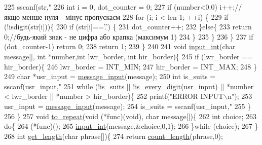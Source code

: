 \begin{DoxyCodeInclude}
{{{{{225     sscanf(str,\textcolor{stringliteral}{"%
226     \textcolor{keywordtype}{int} i = 0, dot\_counter = 0;
227     \textcolor{keywordflow}{if} (number<0.0) i++;\textcolor{comment}{// якщо менше нуля - мінус пропускаєм}
228     \textcolor{keywordflow}{for} (i; i < len-1; ++i) \{
229         \textcolor{keywordflow}{if} (!isdigit(str[i]))\{
230             \textcolor{keywordflow}{if} (str[i]==\textcolor{charliteral}{'.'}) \{
231                 dot\_counter++;
232             \}\textcolor{keywordflow}{else}\{
233                 \textcolor{keywordflow}{return} 0;\textcolor{comment}{//будь-який знак - не цифра або крапка (максимум 1)}
234             \}
235         \}
236     \}
237     \textcolor{keywordflow}{if} (dot\_counter-1) \textcolor{keywordflow}{return} 0;
238     \textcolor{keywordflow}{return} 1;
239 \}
240 
241 \textcolor{keywordtype}{void} \hyperlink{main_8c_a6f453bc035d85e967bd5032eca31a155}{input\_int}(\textcolor{keywordtype}{char} message[], \textcolor{keywordtype}{int} *number,\textcolor{keywordtype}{int} lwr\_border, \textcolor{keywordtype}{int} hir\_border)\{
245     \textcolor{keywordflow}{if} (lwr\_border == hir\_border)\{
246         lwr\_border = INT\_MIN;
247         hir\_border = INT\_MAX;
248     \}
249     \textcolor{keywordtype}{char} *usr\_input = \hyperlink{main_8c_a638293d509eded9d6ef7552ae1b17f2b}{message\_input}(message);
250     \textcolor{keywordtype}{int} is\_suits = sscanf(usr\_input,\textcolor{stringliteral}{"%
251     \textcolor{keywordflow}{while} (!is\_suits || !\hyperlink{main_8c_a9594b83ee908d195f5ff508da5c23c58}{is\_every\_digit}(usr\_input) || *number < lwr\_border || *number > 
      hir\_border)\{
252         printf(\textcolor{stringliteral}{"ERROR INPUT\(\backslash\)n"});
253         usr\_input = \hyperlink{main_8c_a638293d509eded9d6ef7552ae1b17f2b}{message\_input}(message);
254         is\_suits = sscanf(usr\_input,\textcolor{stringliteral}{"%
255     \}
256 \}
257 \textcolor{keywordtype}{void} \hyperlink{main_8c_a770281b98587f9f65ca4cc75b1d061db}{to\_repeat}(\textcolor{keywordtype}{void} (*func)(\textcolor{keywordtype}{void}), \textcolor{keywordtype}{char} message[])\{
262     \textcolor{keywordtype}{int} choice;
263     \textcolor{keywordflow}{do}\{
264         (*func)();
265         \hyperlink{main_8c_a6f453bc035d85e967bd5032eca31a155}{input\_int}(message,&choice,0,1);
266     \}\textcolor{keywordflow}{while} (choice);
267 \}
268 \textcolor{keywordtype}{int} \hyperlink{main_8c_a48523aba9a802fbdca6e9670a036253c}{get\_length}(\textcolor{keywordtype}{char} phrase[])\{
274     \textcolor{keywordflow}{return} \hyperlink{main_8c_a39c41664490ca73a6f8b8224e1191711}{count\_length}(phrase,0);
}}}}}}}}
\end{DoxyCodeInclude}
